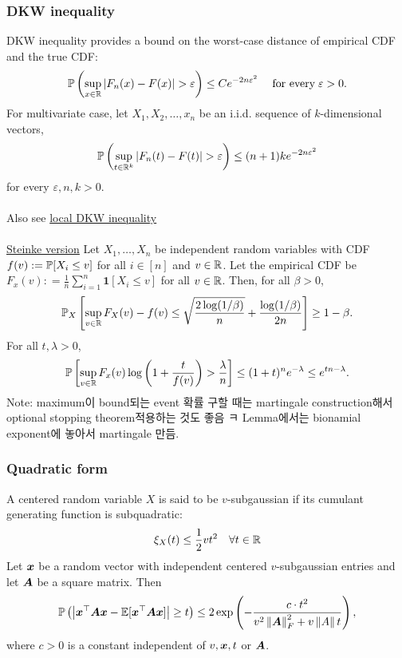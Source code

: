 \documentclass[10pt]{article}
\begin{document}
\subsubsection{DKW inequality}
DKW inequality provides a bound on the worst-case distance of empirical CDF and the true CDF: 
\begin{equation}
    \mathbb{P} \left( \sup_{x \in \mathbb{R}} | F_n (x) - F(x)| > \varepsilon \right) \leq C e^{- 2n \varepsilon^2} \quad \text{\;for every\;} \varepsilon >0.
\end{equation}
For multivariate case, let $X_1, X_2, \dots, x_n$ be an i.i.d. sequence of $k$-dimensional vectors, 
\begin{equation}
    \mathbb{P}\left( \sup_{t \in \mathbb{R}^k} | F_n (t) - F(t)  | > \varepsilon \right) \leq (n+1) k e^{-2n \varepsilon^2}
\end{equation}
for every $\varepsilon, n , k >0$. \\~\\  
Also see \href{https://x.com/ccanonne_/status/1785118388911775796/photo/1}{local DKW inequality}
\\~\\
\href{https://x.com/shortstein/status/1798864427174986096/photo/1}{Steinke version} Let $X_1, \dots, X_n$ be independent random variables with CDF $f(v) := \mathbb{P}[X_i \leq v]$ for all $i \in [n]$ and $v \in \mathbb{R}$. Let the empirical CDF be $F_x (v): = \frac{1}{n} \sum_{i=1}^n \mathbf{1}[X_i \leq v]$ for all $v \in \mathbb{R}$. Then, for all $\beta >0$, 
\begin{equation}
    \mathbb{P}_X \left[ \sup_{v \in \mathbb{R}} F_X (v) - f(v) \leq \sqrt{\frac{2 \log (1/ \beta)}{n}} + \frac{\log (1/ \beta)}{2n} \right] \geq 1- \beta.
\end{equation}
 For all $t, \lambda >0$, 
\begin{equation}
    \mathbb{P} \left[ \sup_{v \in \mathbb{R}} F_x (v) \log \left(1 + \frac{t}{f(v)} \right) > \frac{\lambda}{n} \right] \leq (1+t)^n e^{-\lambda} \leq e^{tn - \lambda}. 
\end{equation}
Note: maximum이 bound되는 event 확률 구할 때는 martingale construction해서 optional stopping theorem적용하는 것도 좋음 ㅋ Lemma에서는 bionamial exponent에 놓아서 martingale 만듬.  
\subsubsection{Quadratic form}
 A centered random variable $X$ is said to be $v$-subgaussian if its cumulant generating function is subquadratic:
\begin{equation}
    \xi_X (t) \leq \frac{1}{2} v t^2 \quad \forall t \in \mathbb{R} 
\end{equation}
 Let ${\bm{x}}$ be a random vector with independent centered $v$-subgaussian entries and let ${\bm{A}}$ be a square matrix. Then 
\begin{equation}
\mathop{\mathbb{P} \displaystyle} \left( \left|{\bm{x}}^{\top} {\bm{A}} {\bm{x}} - \mathop{\mathbb{E} \displaystyle} [ {\bm{x}}^{\top} {\bm{A}} {\bm{x}}] \right| \geq t \right) \leq 2 \exp \left( - \frac{c \cdot t^2}{v^2 \left\lVert{\bm{A}}\right\rVert_F^2 + v \left\lVert A\right\rVert t}  \right),
\end{equation}
where $c>0$ is a constant independent of $v,{\bm{x}},t$ or ${\bm{A}}$. 
\end{document}

